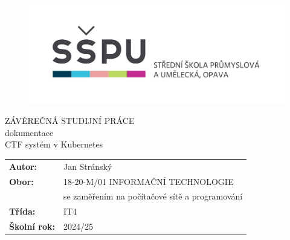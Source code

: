 \documentclass[12pt, a4paper,
oneside,      %
openright
]{report}
\title{\nazevPrace} %
\author{\jmenoAutora} %
\date{\datumOdevzdani} %
\newcommand\obor{INFORMAČNÍ TECHNOLOGIE} %
\newcommand\kodOboru{18-20-M/01} %
\newcommand\zamereni{se zaměřením na počítačové sítě a programování} %
\newcommand\trida{IT4} %
\newcommand\jmenoAutora{Jan Stránský}  %
\newcommand\skolniRok{2024/25} %
\newcommand\nazevPrace{CTF systém v Kubernetes} %
\begin{document}
	
	\pagestyle{empty}
	
	\cleardoublepage

	
	{\selectfont
		\begin{figure}[h]
			\centering
			\includegraphics[width=0.6\linewidth]{image/logo-skoly.png} 
		\end{figure}
		
		
		{\bfseries %
			\begin{center}
				\vspace{0.025 \textheight}
				\LARGE{ZÁVĚREČNÁ STUDIJNÍ PRÁCE}\\
				\large{dokumentace}\\
				\vspace{0.075 \textheight}
				\LARGE {\nazevPrace}\\
			\end{center}  
		}%
		
		
		\vspace{0.02 \textheight}
		\begin{table}[h!]
			\begin{tabular}{ll}
				\textbf{Autor:} & \jmenoAutora\\ 
				\textbf{Obor:} & \kodOboru { } \obor\\
				\textbf{} & \zamereni\\
				\textbf{Třída:} & \trida\\
				\textbf{Školní rok:} & \skolniRok\\
			\end{tabular}
			
		\end{table}		
	}
	
\cleardoublepage %
	
\end{document}
